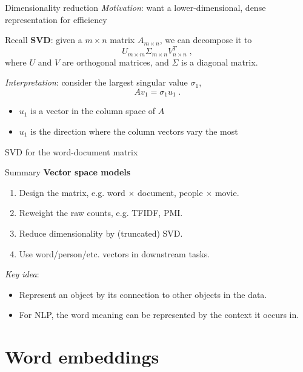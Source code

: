 \documentclass[usenames,dvipsnames,notes]{beamer}
\begin{document}
\begin{frame}
    {Dimensionality reduction}
    \emph{Motivation}: want a lower-dimensional, dense representation for efficiency

    Recall \textbf{SVD}: given a $m\times n$ matrix $A_{m\times n}$,
    we can decompose it to
    $$
    U_{m\times m}\Sigma_{m\times n}V_{n\times n}^T \;,
    $$
    where $U$ and $V$ are orthogonal matrices, and $\Sigma$ is a diagonal matrix.

    \emph{Interpretation}: consider the largest singular value $\sigma_1$,
    $$
    Av_1 = \sigma_1 u_1 \;.
    $$
    \vspace{-2em}
    \begin{itemize}
        \item $u_1$ is a vector in the column space of $A$
        \item $u_1$ is the direction where the column vectors vary the most
    \end{itemize}
\end{frame}

\begin{frame}
    {SVD for the word-document matrix}
\end{frame}

\begin{frame}
    {Summary}
    \textbf{Vector space models}\\
    \begin{enumerate}
        \item Design the matrix, e.g. word $\times$ document, people $\times$ movie.
        \item Reweight the raw counts, e.g. TFIDF, PMI.
        \item Reduce dimensionality by (truncated) SVD.
        \item Use word/person/etc. vectors in downstream tasks.
    \end{enumerate}
    
    \emph{Key idea}:\\
    \begin{itemize}
        \item Represent an object by its connection to other objects in the data.
        \item For NLP, the word meaning can be represented by the context it occurs in.
    \end{itemize}
\end{frame}

\section{Word embeddings}
\end{document}
